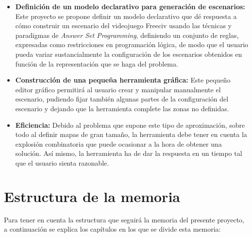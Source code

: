 \begin{itemize}
	\item \textbf{Definición de un modelo declarativo para generación de escenarios:} Este proyecto se propone definir un modelo declarativo que dé respuesta a cómo construir un escenario del videojuego Freeciv usando las técnicas y paradigmas de \textit{Answer Set Programming}, definiendo un conjunto de reglas, expresadas como restricciones en programación lógica, de modo que el usuario pueda variar sustancialmente la configuración de los escenarios obtenidos en función de la representación que se haga del problema.
	\item \textbf{Construcción de una pequeña herramienta gráfica:} Este pequeño editor gráfico permitirá al usuario crear y manipular manualmente el escenario, pudiendo fijar también algunas partes de la configuración del escenario y dejando que la herramienta complete las zonas no definidas.
	\item \textbf{Eficiencia:} Debido al problema que supone este tipo de aproximación, sobre todo al definir mapas de gran tamaño, la herramienta debe tener en cuenta la explosión combinatoria que puede ocasionar a la hora de obtener una solución. Así mismo, la herramienta ha de dar la respuesta en un tiempo tal que el usuario sienta razonable.
\end{itemize}

\section{Estructura de la memoria}

Para tener en cuenta la estructura que seguirá la memoria del presente proyecto, a continuación se explica los capítulos en los que se divide esta memoria:

